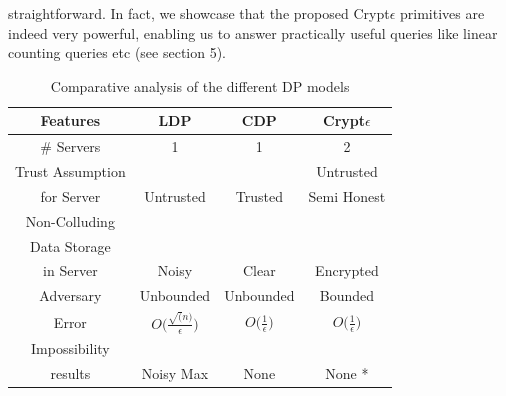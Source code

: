 straightforward. In fact, we showcase that the proposed Crypt$\epsilon$ primitives are indeed very powerful, enabling us to answer practically useful queries like linear counting queries etc (see section 5). 
\begin{table}[h!]
\centering
\caption {Comparative analysis of the different DP models}
 \begin{tabular}{c c c c}  \toprule
\textbf{Features} & \textbf{LDP}  & \textbf{CDP}  & \textbf{Crypt$\epsilon$}  \\ [0.5ex] 
 \midrule \# Servers & 1& 1 & 2 \\
Trust Assumption && & Untrusted \\  for Server & Untrusted  & Trusted  & Semi Honest \\ Non-Colluding  \\ 
Data Storage \\in Server & Noisy & Clear & Encrypted \\
Adversary & Unbounded & Unbounded & Bounded \\
 Error & $O\Big(\frac{\sqrt(n)}{\epsilon}\Big)$& $O\Big(\frac{1}{\epsilon}\Big)$ & $O\Big(\frac{1}{\epsilon}\Big)$\\\hline
 Impossibility \\results & Noisy Max & None & None *\\
  [1ex] 
 \bottomrule
 \end{tabular}
\end{table}
